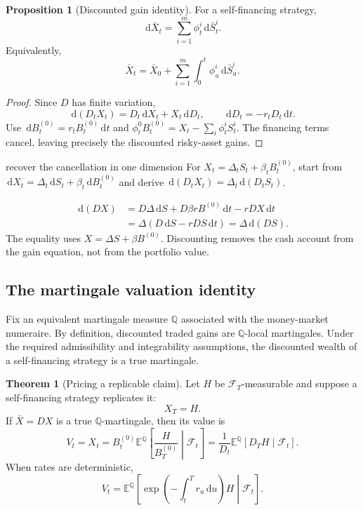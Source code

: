 \documentclass[10pt]{article}
\newcommand{\E}{\mathbb E}
\newcommand{\Q}{\mathbb Q}
\newcommand{\1}{\mathbf 1}
\newcommand{\cF}{\mathcal F}
\newcommand{\dd}{\,\mathrm d}
\theoremstyle{definition}
\newtheorem{proposition}[definition]{Proposition}
\newtheorem{theorem}[definition]{Theorem}
\begin{document}
\begin{proposition}[Discounted gain identity]
For a self-financing strategy,
\[
\boxed{\dd\bar X_t=\sum_{i=1}^m\phi_t^i\dd\bar S_t^i.}
\]
Equivalently,
\[
\bar X_t=\bar X_0+\sum_{i=1}^m
\int_0^t\phi_u^i\dd\bar S_u^i.
\]
\end{proposition}

\begin{proof}
Since \(D\) has finite variation,
\[
\dd(D_tX_t)=D_t\dd X_t+X_t\dd D_t,
\qquad
\dd D_t=-r_tD_t\dd t.
\]
Use \(\dd B_t^{(0)}=r_tB_t^{(0)}\dd t\) and
\(\phi_t^0B_t^{(0)}=X_t-\sum_i\phi_t^iS_t^i\). The financing terms cancel,
leaving precisely the discounted risky-asset gains.
\end{proof}

\begin{studentexercise}{recover the cancellation in one dimension}
For \(X_t=\Delta_tS_t+\beta_tB_t^{(0)}\), start from
\(\dd X_t=\Delta_t\dd S_t+\beta_t\dd B_t^{(0)}\) and derive
\(\dd(D_tX_t)=\Delta_t\dd(D_tS_t)\).
\end{studentexercise}
\begin{shortsolution}
\[
\begin{aligned}
\dd(DX)
&=D\Delta\dd S+D\beta rB^{(0)}\dd t-rDX\dd t\\
&=\Delta(D\dd S-rDS\dd t)
=\Delta\dd(DS).
\end{aligned}
\]
The equality uses \(X=\Delta S+\beta B^{(0)}\). Discounting removes the
cash account from the gain equation, not from the portfolio value.
\end{shortsolution}

\subsection{The martingale valuation identity}

Fix an equivalent martingale measure \(\Q\) associated with the money-market
numeraire. By definition, discounted traded gains are \(\Q\)-local
martingales. Under the required admissibility and integrability assumptions,
the discounted wealth of a self-financing strategy is a true martingale.

\begin{theorem}[Pricing a replicable claim]
Let \(H\) be \(\cF_T\)-measurable and suppose a self-financing strategy
replicates it:
\[
X_T=H.
\]
If \(\bar X=DX\) is a true \(\Q\)-martingale, then its value is
\[
\boxed{
V_t=X_t
=B_t^{(0)}\E^\Q\left[\frac{H}{B_T^{(0)}}\middle|\cF_t\right]
=\frac{1}{D_t}\E^\Q[D_TH\mid\cF_t].}
\]
When rates are deterministic,
\[
\boxed{
V_t=\E^\Q\left[
\exp\left(-\int_t^T r_u\dd u\right)H
\middle|\cF_t\right].}
\]
\end{theorem}
\end{document}
